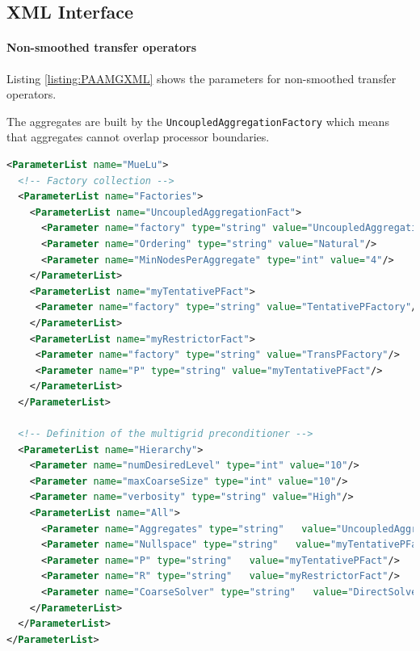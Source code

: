\documentclass[12pt,a4paper]{article}
\newcommand{\MueLu}{MueLu}
\begin{document}
\subsection{XML Interface}

\paragraph{Non-smoothed transfer operators}

Listing \ref{listing:PAAMGXML} shows the parameters for non-smoothed transfer operators.

The aggregates are built by the \verb|UncoupledAggregationFactory| which means that aggregates cannot overlap processor boundaries.

\begin{Listing}
\begin{center}
\begin{lstlisting}[language=XML,label=listing:PAXML]
<ParameterList name="MueLu">
  <!-- Factory collection -->
  <ParameterList name="Factories">
    <ParameterList name="UncoupledAggregationFact">
      <Parameter name="factory" type="string" value="UncoupledAggregationFactory"/>
      <Parameter name="Ordering" type="string" value="Natural"/>
      <Parameter name="MinNodesPerAggregate" type="int" value="4"/>
    </ParameterList>
    <ParameterList name="myTentativePFact">
     <Parameter name="factory" type="string" value="TentativePFactory"/>
    </ParameterList>
    <ParameterList name="myRestrictorFact">
     <Parameter name="factory" type="string" value="TransPFactory"/>
     <Parameter name="P" type="string" value="myTentativePFact"/>
    </ParameterList>
  </ParameterList>

  <!-- Definition of the multigrid preconditioner -->
  <ParameterList name="Hierarchy">
    <Parameter name="numDesiredLevel" type="int" value="10"/>
    <Parameter name="maxCoarseSize" type="int" value="10"/>
    <Parameter name="verbosity" type="string" value="High"/>
    <ParameterList name="All">
      <Parameter name="Aggregates" type="string"   value="UncoupledAggregationFact"/>
      <Parameter name="Nullspace" type="string"   value="myTentativePFact"/>
      <Parameter name="P" type="string"   value="myTentativePFact"/>
      <Parameter name="R" type="string"   value="myRestrictorFact"/>
      <Parameter name="CoarseSolver" type="string"   value="DirectSolver"/>
    </ParameterList>
  </ParameterList>
</ParameterList>
\end{lstlisting}
\caption{Structure of XML input file for \MueLu~ with non-smoothed aggregation transfer operators.}
\label{listing:PAAMGXML}
\end{center}
\end{Listing}
\end{document}
